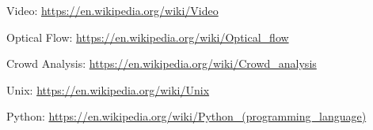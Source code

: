 \begin{thebibliography}{99}
Video: \url{https://en.wikipedia.org/wiki/Video}

Optical Flow: \url{https://en.wikipedia.org/wiki/Optical_flow}

Crowd Analysis: \url{https://en.wikipedia.org/wiki/Crowd_analysis}

Unix: \url{https://en.wikipedia.org/wiki/Unix}

Python: \url{https://en.wikipedia.org/wiki/Python_(programming_language)}





\end{thebibliography}
